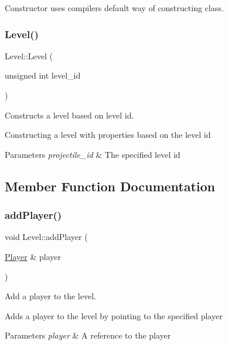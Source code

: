 Constructor uses compiler\textquotesingle{}s default way of constructing class. \mbox{\label{classLevel_a8fc569ff48384440a513dfc188d4f96d}} 
\subsubsection{\texorpdfstring{Level()}{Level()}\hspace{0.1cm}{\footnotesize\ttfamily [2/2]}}
{\footnotesize\ttfamily Level\+::\+Level (\begin{DoxyParamCaption}\item[{unsigned int}]{level\+\_\+id }\end{DoxyParamCaption})}



Constructs a level based on level id. 

Constructing a level with properties based on the level id 
\begin{DoxyParams}{Parameters}
{\em projectile\+\_\+id} & The specified level id \\
\hline
\end{DoxyParams}


\subsection{Member Function Documentation}
\mbox{\label{classLevel_a403167dadfaccc9f5d9269845bcda34f}} 
\subsubsection{\texorpdfstring{add\+Player()}{addPlayer()}}
{\footnotesize\ttfamily void Level\+::add\+Player (\begin{DoxyParamCaption}\item[{\hyperlink{classPlayer}{Player} \&}]{player }\end{DoxyParamCaption})}



Add a player to the level. 

Adds a player to the level by pointing to the specified player 
\begin{DoxyParams}{Parameters}
{\em player} & A reference to the player \\
\hline
\end{DoxyParams}
\mbox{\label{classLevel_af7eb4bcc3f48dce1da830b4601cc8bb5}} 
